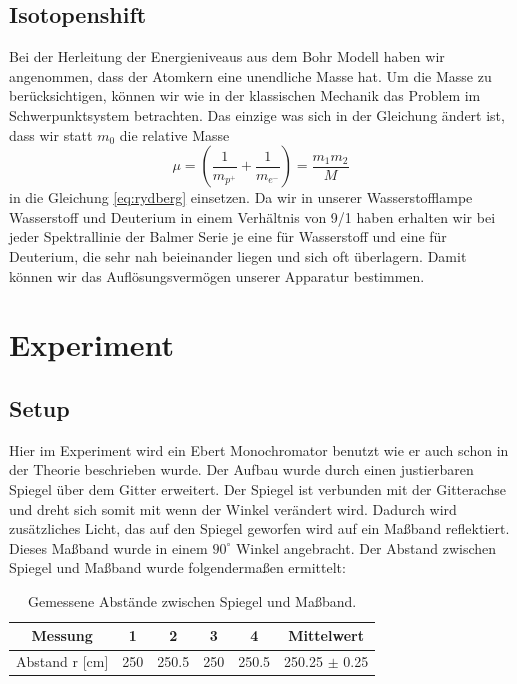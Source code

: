 \documentclass[]{article}
\begin{document}
\subsection{Isotopenshift}
Bei der Herleitung der Energieniveaus aus dem Bohr Modell haben wir angenommen, dass der Atomkern eine unendliche Masse hat. Um die Masse zu berücksichtigen, können wir wie in der klassischen Mechanik das Problem im Schwerpunktsystem betrachten. Das einzige was sich in der Gleichung ändert ist, dass wir statt $m_0$ die relative Masse 
\begin{equation}
	\mu=\left(\frac{1}{m_{p^+}}+\frac{1}{m_{e^-}}  \right)= \frac{m_1 m_2}{M}
\end{equation}
in die Gleichung \ref{eq:rydberg} einsetzen. Da wir in unserer Wasserstofflampe Wasserstoff und Deuterium in einem Verhältnis von 9/1 haben erhalten wir bei jeder Spektrallinie der Balmer Serie je eine für Wasserstoff und eine für Deuterium, die sehr nah beieinander liegen und sich oft überlagern. Damit können wir das Auflösungsvermögen unserer Apparatur bestimmen.




\newpage
\section{Experiment}
\subsection{Setup}

Hier im Experiment wird ein Ebert Monochromator benutzt wie er auch schon in der Theorie beschrieben wurde. Der Aufbau wurde durch einen justierbaren Spiegel über dem Gitter erweitert. Der Spiegel ist verbunden mit der Gitterachse und dreht sich somit mit wenn der Winkel verändert wird. Dadurch wird zusätzliches Licht, das auf den Spiegel geworfen wird auf ein Maßband reflektiert. Dieses Maßband wurde in einem $90^\circ$ Winkel angebracht. Der Abstand zwischen Spiegel und Maßband wurde folgendermaßen ermittelt:

\begin{table}[H]
	\centering
	\begin{tabular}{c|c|c|c|c|c}
		Messung & 1 & 2 & 3 & 4 & Mittelwert \\
		\hline
		Abstand r [cm] & 250 & 250.5 & 250 & 250.5 & 250.25 $\pm$ 0.25 \\
	\end{tabular}
	\caption{Gemessene Abstände zwischen Spiegel und Maßband.}
\end{table}
\end{document}
